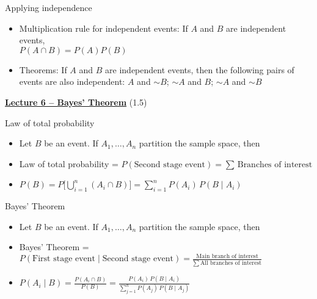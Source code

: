 \documentclass{article}
\newcommand{\bu}[1]{\textbf{\ul{#1}}}				%
\newcommand{\comp}{{\sim}}			%
\newcommand{\vecn}[2]{#1_1, \ldots, #1_{#2}}		%
\begin{document}
Applying independence
\begin{itemize}
    \item Multiplication rule for independent events: If $A$ and $B$ are independent events,\\$P(A \cap B) = P(A) P(B)$
    \item Theorems: If $A$ and $B$ are independent events, then the following pairs of events are also independent: $A$ and $\comp B$; $\comp A$ and $B$; $\comp A$ and $\comp B$
\end{itemize}    

\vspace{100pt}

{\large \bu{Lecture 6 -- Bayes' Theorem}} (1.5)\bigskip

Law of total probability
\begin{itemize}
    \item Let $B$ be an event. If $\vecn{A}{n}$ partition the sample space, then
    \item[] Law of total probability = $P(\text{Second stage event}) = \sum \, \text{Branches of interest}$
    \item[] $\displaystyle P(B) = P\big[\bigcup_{i = 1}^{n} (A_i \cap B)\big] = \sum_{i = 1}^{n} P(A_i) \, P(B \mid A_i)$
\end{itemize}\bigskip

Bayes' Theorem
\begin{itemize}
    \item Let $B$ be an event. If $\vecn{A}{n}$ partition the sample space, then
    \item[] Bayes' Theorem = $ P(\text{First stage event} \mid \text{Second stage event}) = \frac{\text{Main branch of interest}}{\sum \, \text{All branches of interest}}$
    \item[] $\displaystyle P(A_i \mid B) = \frac{P(A_i \cap B)}{P(B)} = \frac{P(A_i) \, P(B \mid A_i)}{\sum_{j = 1}^{n} P(A_j) \, P(B \mid A_j)}$
\end{itemize}\bigskip
\end{document}
